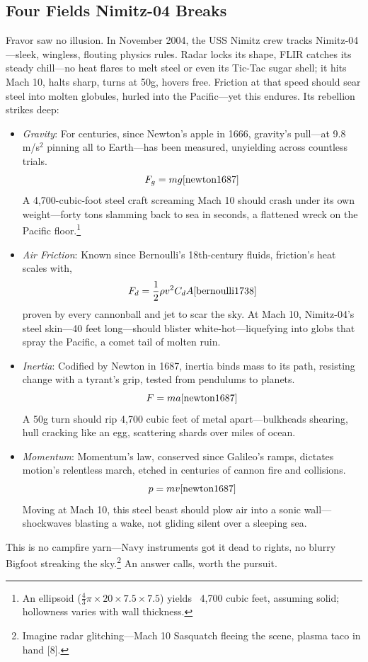 \documentclass[11pt]{article}
\begin{document}
	\subsection{Four Fields Nimitz-04 Breaks}
	Fravor saw no illusion. In November 2004, the USS Nimitz crew tracks Nimitz-04—sleek, wingless, flouting physics rules. Radar locks its shape, FLIR catches its steady chill—no heat flares to melt steel or even its Tic-Tac sugar shell; it hits Mach 10, halts sharp, turns at 50g, hovers free. Friction at that speed should sear steel into molten globules, hurled into the Pacific—yet this endures. Its rebellion strikes deep:
	\begin{itemize}
		\item \textit{Gravity}: For centuries, since Newton’s apple in 1666, gravity’s pull—at 9.8 m/s$^2$ pinning all to Earth—has been measured, unyielding across countless trials.
		\begin{equation}
			F_g = mg \cite{newton1687}
		\end{equation}
		A 4,700-cubic-foot steel craft screaming Mach 10 should crash under its own weight---forty tons slamming back to sea in seconds, a flattened wreck on the Pacific floor.\footnote{An ellipsoid (\(\frac{4}{3} \pi \times 20 \times 7.5 \times 7.5\)) yields ~4,700 cubic feet, assuming solid; hollowness varies with wall thickness.}
		\item \textit{Air Friction}: Known since Bernoulli’s 18th-century fluids, friction’s heat scales with,
		\begin{equation}
			F_d = \frac{1}{2} \rho v^2 C_d A \cite{bernoulli1738}
		\end{equation}
		proven by every cannonball and jet to scar the sky. At Mach 10, Nimitz-04’s steel skin—40 feet long—should blister white-hot---liquefying into globs that spray the Pacific, a comet tail of molten ruin.
		\item \textit{Inertia}: Codified by Newton in 1687, inertia binds mass to its path, resisting change with a tyrant’s grip, tested from pendulums to planets.
		\begin{equation}
			F = ma \cite{newton1687}
		\end{equation}
		A 50g turn should rip 4,700 cubic feet of metal apart---bulkheads shearing, hull cracking like an egg, scattering shards over miles of ocean.
		\item \textit{Momentum}: Momentum’s law, conserved since Galileo’s ramps, dictates motion's relentless march, etched in centuries of cannon fire and collisions.
		\begin{equation}
			p = mv \cite{newton1687}
		\end{equation}
		Moving at Mach 10, this steel beast should plow air into a sonic wall---shockwaves blasting a wake, not gliding silent over a sleeping sea.
	\end{itemize}
	This is no campfire yarn—Navy instruments got it dead to rights, no blurry Bigfoot streaking the sky.\footnote{Imagine radar glitching—Mach 10 Sasquatch fleeing the scene, plasma taco in hand [8].} An answer calls, worth the pursuit.
	
\end{document}
